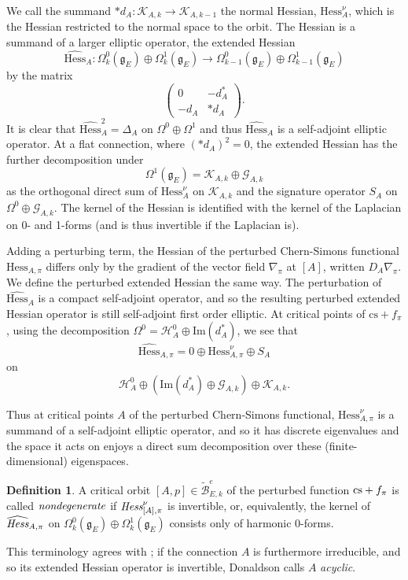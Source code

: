 \documentclass[10pt,a4paper]{amsart}
\theoremstyle{definition}
\newtheorem{definition}[theorem]{Definition}
\theoremstyle{remark}
\numberwithin{figure}{qchap}
\begin{document}
We call the summand $*d_A: \mathcal K_{A,k} \to \mathcal K_{A,k-1}$ the normal Hessian, $\text{Hess}^\nu_{A}$, which is the Hessian restricted to the normal space to the orbit. The Hessian is a summand of a larger elliptic operator, the extended Hessian 
$$\widehat{\text{Hess}}_A: \Omega^0_k(\mathfrak g_E) \oplus \Omega^1_k(\mathfrak g_E) \to \Omega^0_{k-1}(\mathfrak g_E) \oplus \Omega^1_{k-1}(\mathfrak g_E)$$ 
by the matrix 
\[\begin{pmatrix}0 & -d_A^* \\ - d_A & * d_A\end{pmatrix}.\] 
It is clear that $\widehat{\text{Hess}}_A^2 = \Delta_A$ on $\Omega^0 \oplus \Omega^1$ and thus $\widehat{\text{Hess}}_A$ is a self-adjoint elliptic operator. At a flat connection, where $(*d_A)^2 = 0$, the extended Hessian has the further decomposition under 
$$\Omega^1(\mathfrak g_E) = \mathcal K_{A,k} \oplus \mathcal G_{A,k}$$ 
as the orthogonal direct sum of $\text{Hess}^\nu_{A}$ on $\mathcal K_{A,k}$ and the signature operator $S_A$ on $\Omega^0 \oplus \mathcal G_{A,k}$. The kernel of the Hessian is identified with the kernel of the Laplacian on 0- and 1-forms (and is thus invertible if the Laplacian is).

Adding a perturbing term, the Hessian of the perturbed Chern-Simons functional $\text{Hess}_{A, \pi}$ differs only by the gradient of the vector field $\nabla_\pi$ at $[A]$, written $D_A \nabla_\pi$. We define the perturbed extended Hessian the same way. The perturbation of $\widehat{\text{Hess}}_{A}$ is a compact self-adjoint operator, and so the resulting perturbed extended Hessian operator is still self-adjoint first order elliptic. At critical points of $\text{cs}+f_\pi$, using the decomposition $\Omega^0 = \mathcal H^0_A \oplus \text{Im}(d_A^*)$, we see that 
$$\widehat{\text{Hess}}_{A,\pi} = 0 \oplus \text{Hess}_{A,\pi}^\nu \oplus S_A$$ 
on 
$$\mathcal H^0_A \oplus (\text{Im}(d_A^*) \oplus \mathcal G_{A,k}) \oplus \mathcal K_{A,k}.$$ 

Thus at critical points $A$ of the perturbed Chern-Simons functional, $\text{Hess}^\nu_{A,\pi}$ is a summand of a self-adjoint elliptic operator, and so it has discrete eigenvalues and the space it acts on enjoys a direct sum decomposition over these (finite-dimensional) eigenspaces.

\begin{definition}A critical orbit $[A,p] \in \widetilde{\mathcal B}^e_{E,k}$ of the perturbed function $\textup{cs} + f_\pi$ is called $\text{\em{nondegenerate}}$ if $\text{\em{Hess}}^\nu_{[A],\pi}$ is invertible, or, equivalently, the kernel of $\widehat{\text{\em{Hess}}}_{A,\pi}$ on $\Omega^0_k(\mathfrak g_E) \oplus \Omega^1_k(\mathfrak g_E)$ consists only of harmonic 0-forms.\end{definition}
This terminology agrees with \cite{Don}; if the connection $A$ is furthermore irreducible, and so its extended Hessian operator is invertible, Donaldson calls $A$ \textit{acyclic}.
\end{document}
